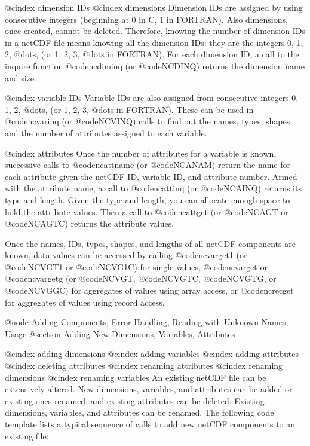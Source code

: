 @cindex dimension IDs
@cindex dimensions
Dimension IDs are assigned by using consecutive integers (beginning at 0
in C, 1 in FORTRAN).  Also dimensions, once created, cannot be deleted.
Therefore, knowing the number of dimension IDs in a netCDF file means knowing
all the dimension IDs: they are the integers 0, 1, 2, @dots{}, (or 1, 2,
3, @dots{} in FORTRAN).  For each dimension ID, a call to the inquire
function @code{ncdiminq} (or @code{NCDINQ}) returns the dimension name
and size.

@cindex variable IDs
Variable IDs are also assigned from consecutive integers 0, 1, 2,
@dots{}, (or 1, 2, 3,
@dots{} in FORTRAN).  These can be used in @code{ncvarinq} (or
@code{NCVINQ}) calls to find out the names, types, shapes, and the
number of attributes assigned to each variable.

@cindex attributes
Once the number of attributes for a variable is known, successive calls
to @code{ncattname} (or @code{NCANAM}) return the name for
each attribute given the netCDF ID, variable ID, and attribute number.
Armed with the attribute name, a call to @code{ncattinq} (or
@code{NCAINQ}) returns its type and length.  Given the type
and length, you can allocate enough space to hold
the attribute values.  Then a call to @code{ncattget} (or @code{NCAGT}
or @code{NCAGTC}) returns the attribute values.

Once the names, IDs, types, shapes, and lengths of all netCDF components
are known, data values can be accessed by calling @code{ncvarget1} (or
@code{NCVGT1} or @code{NCVG1C}) for single values, @code{ncvarget} or
@code{ncvargetg}
(or @code{NCVGT}, @code{NCVGTC}, @code{NCVGTG}, or @code{NCVGGC}) for
aggregates of values using array access, or @code{ncrecget} for
aggregates of values using record access.

@node Adding Components, Error Handling, Reading with Unknown Names, Usage
@section Adding New Dimensions, Variables, Attributes

@cindex adding dimensions
@cindex adding variables
@cindex adding attributes
@cindex deleting attributes
@cindex renaming attributes
@cindex renaming dimensions
@cindex renaming variables
An existing netCDF file can be extensively altered.  New dimensions,
variables, and attributes can be added or existing ones renamed, and
existing attributes can be deleted.  Existing dimensions, variables, and
attributes can be renamed.  The following code template lists a typical
sequence of calls to add new netCDF components to an existing file:


